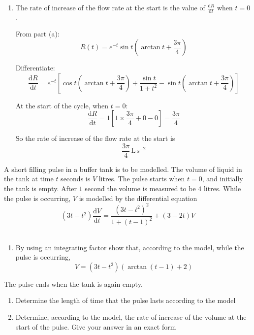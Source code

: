 \documentclass[leqno]{article}
\begin{document}
\begin{enumerate}[
  label=\textbf{\arabic*.},
  leftmargin=*,
  topsep=0pt,
  partopsep=0pt,
  parsep=0pt
]
\begin{djsSolution}
\begin{enumerate}[label=\textbf{(\alph*)}]
  Therefore the cycle lasts \(\pi\) seconds.

\item The rate of increase of the flow rate at the start is the value of \(\frac{\mathrm{d}R}{\mathrm{d}t}\) when \(t=0\).

From part (a):
\[
R(t)=e^{-t}\sin t\left(\arctan t+\frac{3\pi}{4}\right)
\]

Differentiate:
\[
\frac{\mathrm{d}R}{\mathrm{d}t}
= e^{-t}\left[\cos t\left(\arctan t+\frac{3\pi}{4}\right)
+\frac{\sin t}{1+t^2}
-\sin t\left(\arctan t+\frac{3\pi}{4}\right)\right]
\]

At the start of the cycle, when \(t=0\):
\[
\frac{\mathrm{d}R}{\mathrm{d}t}
=1\left[1\times\frac{3\pi}{4}+0-0\right]
=\frac{3\pi}{4}
\]

So the rate of increase of the flow rate at the start is
\[
\frac{3\pi}{4}\,\mathrm{L\,s^{-2}}
\]
\end{enumerate}
\end{djsSolution}


\newpage

\questionitem

A short filling pulse in a buffer tank is to be modelled. The volume of liquid in the tank at time $t$ seconds is $V$ litres. The pulse starts when $t=0$, and initially the tank is empty. After $1$ second the volume is measured to be $4$ litres. While the pulse is occurring, $V$ is modelled by the differential equation
\[
(3t-t^2)\frac{\mathrm{d}V}{\mathrm{d}t}=\frac{(3t-t^2)^2}{1+(t-1)^2}+(3-2t)V 
    \]\\
\begin{enumerate}[label=\textbf{(\alph*)}]
  \item By using an integrating factor show that, according to the model, while the pulse is occurring,
  \[
  V=(3t-t^2)\left(\arctan(t-1)+2\right)
  \] 
\end{enumerate}
The pulse ends when the tank is again empty. \\
\begin{enumerate}[label=\textbf{(\alph*)}, resume]
  \item Determine the length of time that the pulse lasts according to the model  \\
  \item Determine, according to the model, the rate of increase of the volume at the start of the pulse. Give your answer in an exact form  \\
\end{enumerate}


\end{enumerate}
\end{document}
